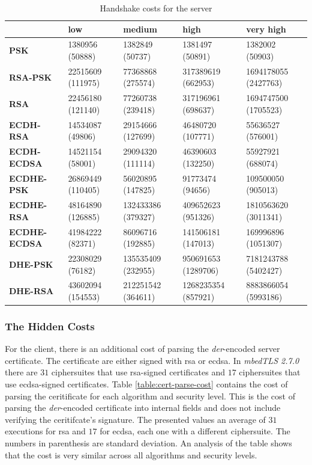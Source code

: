 \documentclass{llncs}
\begin{document}
  \begin{table}[]
\begin{tabular}{|l|l|l|l|l|}
\hline
                     & \textbf{low}      & \textbf{medium}    & \textbf{high}       & \textbf{very high}   \\ \hline
\textbf{PSK}         & 1380956 (50888)   & 1382849 (50737)    & 1381497 (50891)     & 1382002 (50903)      \\ \hline
\textbf{RSA-PSK}     & 22515609 (111975) & 77368868 (275574)  & 317389619 (662953)  & 1694178055 (2427763) \\ \hline
\textbf{RSA}         & 22456180 (121140) & 77260738 (239418)  & 317196961 (698637)  & 1694747500 (1705523) \\ \hline
\textbf{ECDH-RSA}    & 14534087 (49806)  & 29154666 (127699)  & 46480720 (107771)   & 55636527 (576001)    \\ \hline
\textbf{ECDH-ECDSA}  & 14521154 (58001)  & 29094320 (111114)  & 46390603 (132250)   & 55927921 (688074)    \\ \hline
\textbf{ECDHE-PSK}   & 26869449 (110405) & 56020895 (147825)  & 91773474 (94656)    & 109500050 (905013)   \\ \hline
\textbf{ECDHE-RSA}   & 48164890 (126885) & 132433386 (379327) & 409652623 (951326)  & 1810563620 (3011341) \\ \hline
\textbf{ECDHE-ECDSA} & 41984222 (82371)  & 86096716 (192885)  & 141506181 (147013)  & 169996896 (1051307)  \\ \hline
\textbf{DHE-PSK}     & 22308029 (76182)  & 135535409 (232955) & 950691653 (1289706) & 7181243788 (5402427) \\ \hline
\textbf{DHE-RSA}     & 43602094 (154553) & 212251542 (364611) & 1268235354 (857921) & 8883866054 (5993186) \\ \hline
\end{tabular}
  \caption{\label{table:server-hs-cost-all-sls} Handshake costs for the server}
\end{table}

\subsubsection{The Hidden Costs}


For the client, there is an additional cost of parsing the \textit{der}-encoded server certificate. The certificate are either signed with
\gls{rsa} or \gls{ecdsa}. In \textit{mbedTLS 2.7.0} there are $31$ ciphersuites that use \gls{rsa}-signed certificates and $17$ ciphersuites
that use \gls{ecdsa}-signed certificates. Table \ref{table:cert-parse-cost} contains the cost of parsing the ceritificate for each algorithm
and security level. This is the cost of parsing the \textit{der}-encoded certificate into internal fields and does not include verifying 
the ceritifcate's signature. The presented values an average of $31$ executions for \gls{rsa} and $17$ for \gls{ecdsa}, each one with a 
different ciphersuite. The numbers in parenthesis are standard deviation. An analysis of the table shows that the cost is very similar across all
algorithms and security levels.
\end{document}
